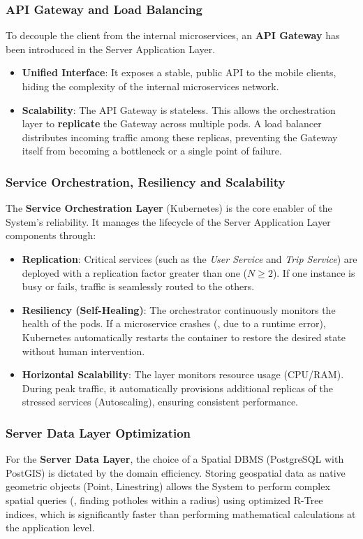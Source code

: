 \subsubsection*{API Gateway and Load Balancing}
To decouple the client from the internal microservices, an \textbf{API Gateway} has been introduced in the Server Application Layer.
\begin{itemize}
    \item \textbf{Unified Interface}: It exposes a stable, public API to the mobile clients, hiding the complexity of the internal microservices network.
    \item \textbf{Scalability}: The API Gateway is stateless. This allows the orchestration layer to \textbf{replicate} the Gateway across multiple pods. A load balancer distributes incoming traffic among these replicas, preventing the Gateway itself from becoming a bottleneck or a single point of failure.
\end{itemize}

\subsubsection*{Service Orchestration, Resiliency and Scalability}
The \textbf{Service Orchestration Layer} (Kubernetes) is the core enabler of the System's reliability. It manages the lifecycle of the Server Application Layer components through:
\begin{itemize}
    \item \textbf{Replication}: Critical services (such as the \emph{User Service} and \emph{Trip Service}) are deployed with a replication factor greater than one ($N \geq 2$). If one instance is busy or fails, traffic is seamlessly routed to the others.
    \item \textbf{Resiliency (Self-Healing)}: The orchestrator continuously monitors the health of the pods. If a microservice crashes (\eg, due to a runtime error), Kubernetes automatically restarts the container to restore the desired state without human intervention.
    \item \textbf{Horizontal Scalability}: The layer monitors resource usage (CPU/RAM). During peak traffic, it automatically provisions additional replicas of the stressed services (Autoscaling), ensuring consistent performance.
\end{itemize}

\subsubsection*{Server Data Layer Optimization}
For the \textbf{Server Data Layer}, the choice of a Spatial DBMS (PostgreSQL with PostGIS) is dictated by the domain efficiency.
Storing geospatial data as native geometric objects (Point, Linestring) allows the System to perform complex spatial queries (\eg, finding potholes within a radius) using optimized R-Tree indices, which is significantly faster than performing mathematical calculations at the application level.

